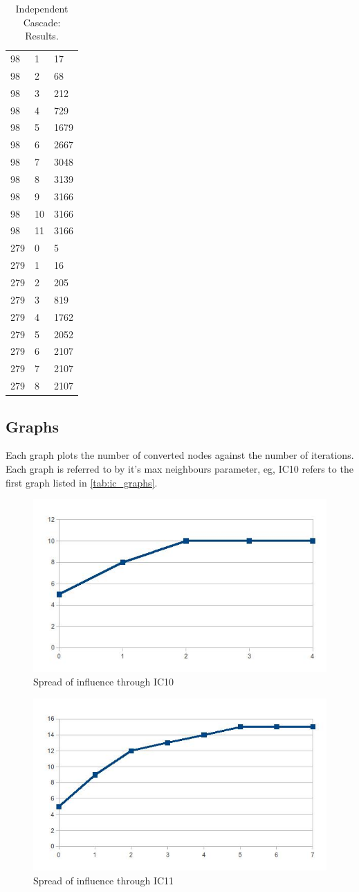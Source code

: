 \begin{table}
\begin{tabular}{|l|l|l|}
98 & 1 & 17 \\
98 & 2 & 68 \\
98 & 3 & 212 \\
98 & 4 & 729 \\
98 & 5 & 1679 \\
98 & 6 & 2667 \\
98 & 7 & 3048 \\
98 & 8 & 3139 \\
98 & 9 & 3166 \\
98 & 10 & 3166 \\
98 & 11 & 3166 \\
\hline
279 & 0 & 5 \\
279 & 1 & 16 \\
279 & 2 & 205 \\
279 & 3 & 819 \\
279 & 4 & 1762 \\
279 & 5 & 2052 \\
279 & 6 & 2107 \\
279 & 7 & 2107 \\
279 & 8 & 2107 \\
\hline
\end{tabular}
\caption{Independent Cascade: Results.}
\label{tab:ic_results}
\end{table}

\subsection{Graphs}

Each graph plots the number of converted nodes against the number of iterations. Each graph is referred to by it's max neighbours parameter, eg, IC10 refers to the first graph listed in \ref{tab:ic_graphs}.

\begin{figure}[htbp]%
\centering
\includegraphics[width=0.5\columnwidth]{./img/ic10}%
\caption{Spread of influence through IC10}%
\label{fig:ic10}%
\end{figure}

\begin{figure}[htbp]%
\centering
\includegraphics[width=0.5\columnwidth]{./img/ic11}%
\caption{Spread of influence through IC11}%
\label{fig:ic11}%
\end{figure}

